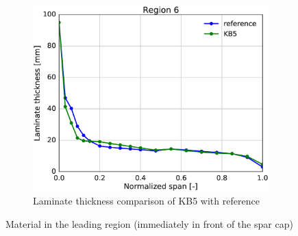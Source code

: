 \begin{figure}[tph]
\begin{subfigure}{\textwidth}
\centering
\includegraphics[width=0.50\linewidth]{figures/KB6_final/KB5_r06_thickness.eps}
\caption{Laminate thickness comparison of KB5 with reference}
\label{subfig:KB5_thick_r06}
\end{subfigure}
\caption{ Material in the leading region (immediately in front of the spar cap)}
\label{fig:KB5_mat_r06}
\end{figure}

